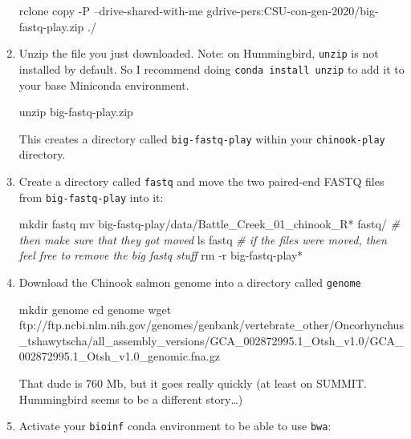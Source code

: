 \documentclass[]{krantz}
\makeatletter
\newenvironment{Shaded}{\begin{snugshade}}{\end{snugshade}}
\newcommand{\BuiltInTok}[1]{#1}
\newcommand{\CommentTok}[1]{\textcolor[rgb]{0.37,0.37,0.37}{\textit{#1}}}
\newcommand{\ExtensionTok}[1]{#1}
\newcommand{\FunctionTok}[1]{\textcolor[rgb]{0,0,0}{#1}}
\newcommand{\NormalTok}[1]{#1}
\newenvironment{kframe}{%
\medskip{}
\setlength{\fboxsep}{.8em}
 \def\at@end@of@kframe{}%
 \ifinner\ifhmode%
  \def\at@end@of@kframe{\end{minipage}}%
  \begin{minipage}{\columnwidth}%
 \fi\fi%
 \def\FrameCommand##1{\hskip\@totalleftmargin \hskip-\fboxsep
 \colorbox{shadecolor}{##1}\hskip-\fboxsep
     \hskip-\linewidth \hskip-\@totalleftmargin \hskip\columnwidth}%
 \MakeFramed {\advance\hsize-\width
   \@totalleftmargin\z@ \linewidth\hsize
   \@setminipage}}%
 {\par\unskip\endMakeFramed%
 \at@end@of@kframe}
\renewenvironment{Shaded}{\begin{kframe}}{\end{kframe}}
\makeatother
\begin{document}
\begin{enumerate}
\begin{Shaded}
\begin{Highlighting}[]
\ExtensionTok{rclone}\NormalTok{ copy -P  --drive-shared-with-me gdrive-pers:CSU-con-gen-2020/big-fastq-play.zip ./}
\end{Highlighting}
\end{Shaded}
\item
  Unzip the file you just downloaded. Note: on Hummingbird, \texttt{unzip} is not installed by default.
  So I recommend doing \texttt{conda\ install\ unzip} to add it to your base Miniconda environment.

\begin{Shaded}
\begin{Highlighting}[]
\FunctionTok{unzip}\NormalTok{ big-fastq-play.zip}
\end{Highlighting}
\end{Shaded}

  This creates a directory called \texttt{big-fastq-play} within your \texttt{chinook-play} directory.
\item
  Create a directory called \texttt{fastq} and move the two paired-end FASTQ files from \texttt{big-fastq-play} into it:

\begin{Shaded}
\begin{Highlighting}[]
\FunctionTok{mkdir}\NormalTok{ fastq }
\FunctionTok{mv}\NormalTok{ big-fastq-play/data/Battle_Creek_01_chinook_R* fastq/}
\CommentTok{# then make sure that they got moved}
\FunctionTok{ls}\NormalTok{ fastq}
\CommentTok{# if the files were moved, then feel free to remove the big fastq stuff}
\FunctionTok{rm}\NormalTok{ -r big-fastq-play*}
\end{Highlighting}
\end{Shaded}
\item
  Download the Chinook salmon genome into a directory called \texttt{genome}

\begin{Shaded}
\begin{Highlighting}[]
 \FunctionTok{mkdir}\NormalTok{ genome}
 \BuiltInTok{cd}\NormalTok{ genome}
 \FunctionTok{wget}\NormalTok{ ftp://ftp.ncbi.nlm.nih.gov/genomes/genbank/vertebrate_other/Oncorhynchus_tshawytscha/all_assembly_versions/GCA_002872995.1_Otsh_v1.0/GCA_002872995.1_Otsh_v1.0_genomic.fna.gz}
\end{Highlighting}
\end{Shaded}

  That dude is 760 Mb, but it goes really quickly (at least on SUMMIT. Hummingbird seems to be a different story\ldots{})
\item
  Activate your \texttt{bioinf} conda environment to be able to use \texttt{bwa}:


\end{enumerate}
\end{document}
